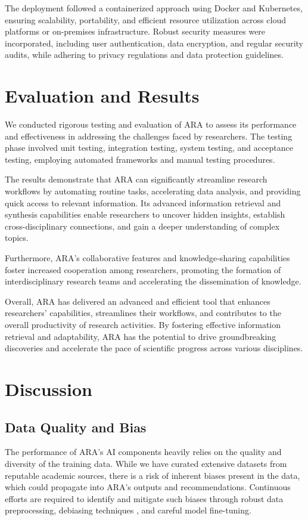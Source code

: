 \documentclass[a4paper,conference]{IEEEtran}
\begin{document}
The deployment followed a containerized approach using Docker and Kubernetes, ensuring scalability, portability, and efficient resource utilization across cloud platforms or on-premises infrastructure. Robust security measures were incorporated, including user authentication, data encryption, and regular security audits, while adhering to privacy regulations and data protection guidelines.

\section{Evaluation and Results}
We conducted rigorous testing and evaluation of ARA to assess its performance and effectiveness in addressing the challenges faced by researchers. The testing phase involved unit testing, integration testing, system testing, and acceptance testing, employing automated frameworks and manual testing procedures.

The results demonstrate that ARA can significantly streamline research workflows by automating routine tasks, accelerating data analysis, and providing quick access to relevant information. Its advanced information retrieval and synthesis capabilities enable researchers to uncover hidden insights, establish cross-disciplinary connections, and gain a deeper understanding of complex topics.

Furthermore, ARA's collaborative features and knowledge-sharing capabilities foster increased cooperation among researchers, promoting the formation of interdisciplinary research teams and accelerating the dissemination of knowledge.

Overall, ARA has delivered an advanced and efficient tool that enhances researchers' capabilities, streamlines their workflows, and contributes to the overall productivity of research activities. By fostering effective information retrieval and adaptability, ARA has the potential to drive groundbreaking discoveries and accelerate the pace of scientific progress across various disciplines.

\section{Discussion}

\subsection{Data Quality and Bias}
The performance of ARA's AI components heavily relies on the quality and diversity of the training data. While we have curated extensive datasets from reputable academic sources, there is a risk of inherent biases present in the data, which could propagate into ARA's outputs and recommendations. Continuous efforts are required to identify and mitigate such biases through robust data preprocessing, debiasing techniques \cite{debias}, and careful model fine-tuning.
\end{document}
